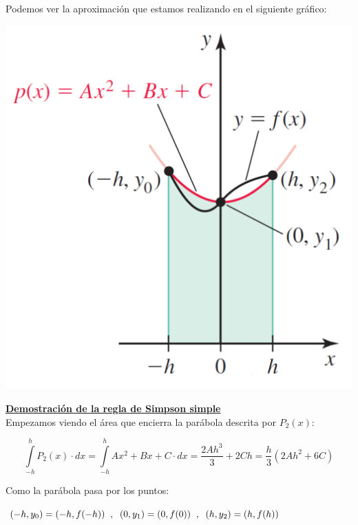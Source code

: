 \documentclass[12pt]{article}
\begin{document}
Podemos ver la aproximación que estamos realizando en el siguiente gráfico:

\begin{center}
\includegraphics[scale=0.55]{simple}
\end{center}

\underline{\textbf{Demostración de la regla de Simpson simple}} \\

Empezamos viendo el área que encierra la parábola descrita por $P_2(x)$:

\begin{equation}\label{eq:simsim}
\int \limits_{-h}^{h} P_2(x) \cdot dx = 
\int \limits_{-h}^{h} Ax^2+Bx+C \cdot dx =
\frac{2Ah^3}{3}+2Ch = \frac{h}{3}(2Ah^2+6C)
\end{equation}

Como la parábola pasa por los puntos:

\begin{center}
$(-h,y_0)=(-h,f(-h)) \hspace{2mm},\hspace{2mm}
(0,y_1)=(0,f(0)) \hspace{2mm},\hspace{2mm}
(h,y_2)=(h,f(h))$
\end{center}
\end{document}
